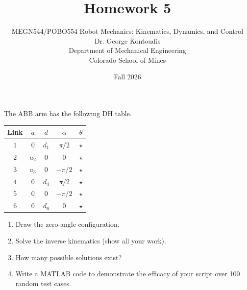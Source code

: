 \documentclass[12pt]{article}
\newenvironment{problem}[2][Problem]{\begin{trivlist}
\item[\hskip \labelsep {\bfseries #1}\hskip \labelsep {\bfseries #2.}]}{\end{trivlist}}
\begin{document}
 
 
\title{Homework 5}
\author{MEGN544/ΡΟΒΟ554 Robot Mechanics: Kinematics, Dynamics, and Control  
\\ 
Dr. George Kontoudis\\
Department of Mechanical Engineering\\
Colorado School of Mines}
\date{Fall 2026}
 
\maketitle
\begin{problem}{1}%
The ABB arm has the following DH table.
\begin{table}[!h]
\centering
\begin{tabular}{c | c | c | c | c}
\hline 
 {Link} & $a$   & $d$   & $\alpha$ & $\theta$\\  \hline
 $1$    & $0$   & $d_1$ & $\pi/2$  & $\star$ \\ 
 $2$    & $a_2$ & $0$   & $0$      & $\star$ \\ 
 $3$    & $a_3$ & $0$   & $-\pi/2$ & $\star$ \\ 
 $4$    & $0$   & $d_4$ & $\pi/2$  & $\star$ \\ 
 $5$    & $0$   & $0$   & $-\pi/2$ & $\star$ \\ 
 $6$    & $0$   & $d_6$ & $0$      & $\star$ \\ \hline
\end{tabular}\label{tab:part_1_ii}
\end{table}
\begin{enumerate}[label=(\alph*)]
    \item Draw the zero-angle configuration. 
    \item Solve the inverse kinematics (show all your work). 
    \item How many possible solutions exist?
    \item Write a MATLAB code to demonstrate the efficacy of your script over 100 random test cases.
\end{enumerate}
 
\end{problem}
\end{document}
